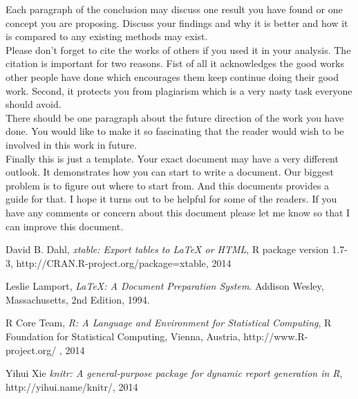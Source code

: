 \documentclass{article}\usepackage[]{graphicx}\usepackage[]{color}
\begin{document}
Each paragraph of the conclusion may discuss one result you have found or one concept you are proposing. Discuss your findings and why it is better and how it is compared to any existing methods may exist. \\

Please don't forget to cite the works of others if you used it in your analysis. The citation is important for two reasons. Fist of all it acknowledges the good works other people have done which encourages them keep continue doing their good work. Second, it protects you from plagiarism which is a very nasty task everyone should avoid.\\

There should be one paragraph about the future direction of the work you have done. You would like to make it so fascinating that the reader would wish to be involved in this work in future. \\

Finally this is just a template. Your exact document may have a very different outlook. It demonstrates how you can start to write a document. Our biggest problem is to figure out where to start from. And this documents provides a guide for that. I hope it turns out to be helpful for some of the readers. If you have any comments or concern about this document please let me know so that I can improve this document. 

\begin{thebibliography}{9}

    David B. Dahl,
    \emph{xtable: Export tables to LaTeX or HTML},
    R package version 1.7-3,
    http://CRAN.R-project.org/package=xtable, 
    2014

  Leslie Lamport, \emph{\LaTeX: A Document Preparation System}.
  Addison Wesley, Massachusetts,
  2nd Edition, 1994.

  R Core Team, \emph{R: A Language and Environment for Statistical Computing},
  R Foundation for Statistical Computing,
  Vienna, Austria, http://www.R-project.org/ ,
  2014
  
  Yihui Xie
  \emph{knitr: A general-purpose package for dynamic report generation in R},
  http://yihui.name/knitr/, 2014  

\end{thebibliography}
\end{document}
